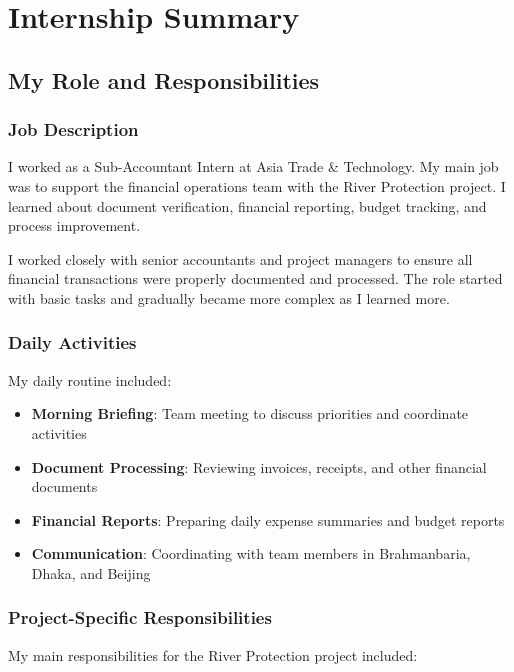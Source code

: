 
\chapter{Internship Summary}

\section{My Role and Responsibilities}

\subsection{Job Description}
I worked as a Sub-Accountant Intern at Asia Trade \& Technology. My main job was to support the financial operations team with the River Protection project. I learned about document verification, financial reporting, budget tracking, and process improvement.

I worked closely with senior accountants and project managers to ensure all financial transactions were properly documented and processed. The role started with basic tasks and gradually became more complex as I learned more.

\vspace{0.3em}
\subsection{Daily Activities}
My daily routine included:

\begin{itemize}[leftmargin=*, itemsep=0.25em]
    \item \textbf{Morning Briefing}: Team meeting to discuss priorities and coordinate activities
    \item \textbf{Document Processing}: Reviewing invoices, receipts, and other financial documents
    \item \textbf{Financial Reports}: Preparing daily expense summaries and budget reports
    \item \textbf{Communication}: Coordinating with team members in Brahmanbaria, Dhaka, and Beijing
\end{itemize}

\subsection{Project-Specific Responsibilities}
My main responsibilities for the River Protection project included:

